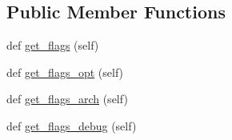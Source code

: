 \subsection*{Public Member Functions}
\begin{DoxyCompactItemize}
\item 
def \hyperlink{classnumpy_1_1distutils_1_1fcompiler_1_1compaq_1_1CompaqVisualFCompiler_afa3e2ac56195b5699c42d32a46178d58}{get\+\_\+flags} (self)
\item 
def \hyperlink{classnumpy_1_1distutils_1_1fcompiler_1_1compaq_1_1CompaqVisualFCompiler_a296a7494057a0b37f61907cdd7f2e0ae}{get\+\_\+flags\+\_\+opt} (self)
\item 
def \hyperlink{classnumpy_1_1distutils_1_1fcompiler_1_1compaq_1_1CompaqVisualFCompiler_ae91b0dee616f4879136c871c513e473f}{get\+\_\+flags\+\_\+arch} (self)
\item 
def \hyperlink{classnumpy_1_1distutils_1_1fcompiler_1_1compaq_1_1CompaqVisualFCompiler_a615c368fba806f11829a52a6b067f29d}{get\+\_\+flags\+\_\+debug} (self)
\end{DoxyCompactItemize}
